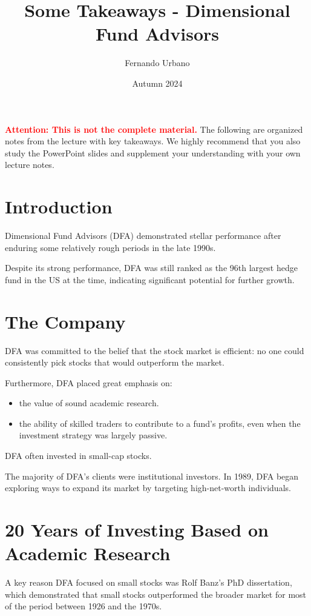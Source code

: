 \documentclass{article}
\title{Some Takeaways - Dimensional Fund Advisors}
\author{Fernando Urbano}
\date{Autumn 2024}
\newcommand{\redbold}[1]{\textbf{\textcolor{red}{#1}}}
\begin{document}
\maketitle

\redbold{Attention: This is not the complete material.} The following are organized notes from the lecture with key takeaways. We highly recommend that you also study the PowerPoint slides and supplement your understanding with your own lecture notes.

\section{Introduction}
Dimensional Fund Advisors (DFA) demonstrated stellar performance after enduring some relatively rough periods in the late 1990s.

Despite its strong performance, DFA was still ranked as the 96th largest hedge fund in the US at the time, indicating significant potential for further growth.

\section{The Company}
DFA was committed to the belief that the stock market is efficient: no one could consistently pick stocks that would outperform the market.

Furthermore, DFA placed great emphasis on:
\begin{itemize}
    \item the value of sound academic research.
    \item the ability of skilled traders to contribute to a fund's profits, even when the investment strategy was largely passive.
\end{itemize}

DFA often invested in small-cap stocks.

The majority of DFA's clients were institutional investors. In 1989, DFA began exploring ways to expand its market by targeting high-net-worth individuals.

\section{20 Years of Investing Based on Academic Research}
A key reason DFA focused on small stocks was Rolf Banz's PhD dissertation, which demonstrated that small stocks outperformed the broader market for most of the period between 1926 and the 1970s.
\end{document}
